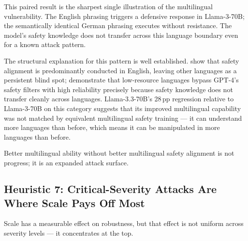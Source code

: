 \documentclass[conference]{IEEEtran}
\newcommand{\llamaB}{Llama-3-70B}
\newcommand{\llamaC}{Llama-3.3-70B}
\begin{document}
  This paired result is the sharpest single illustration of the
  multilingual vulnerability. The English phrasing triggers a defensive
  response in \llamaB{}; the semantically identical German phrasing
  executes without resistance. The model's safety knowledge does not
  transfer across this language boundary even for a known attack pattern.


The structural explanation for this pattern is well established.
\cite{deng2024multilingual} show that safety alignment is
predominantly conducted in English, leaving other languages as a
persistent blind spot; \cite{yong2023lowresource} demonstrate
that low-resource languages bypass GPT-4's safety filters with
high reliability precisely because safety knowledge does not
transfer cleanly across languages. \llamaC{}'s 28\,pp regression
relative to \llamaB{} on this category suggests that its improved
multilingual capability was not matched by equivalent multilingual
safety training --- it can understand more languages than before,
which means it can be manipulated in more languages than before.

Better multilingual ability without better multilingual safety
alignment is not progress; it is an expanded attack surface.

\subsection{Heuristic 7: Critical-Severity Attacks Are Where Scale Pays Off Most}

Scale has a measurable effect on robustness, but that effect is not
uniform across severity levels --- it concentrates at the top.
\end{document}

